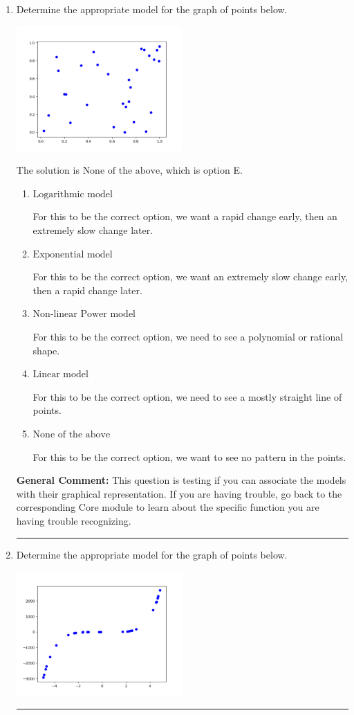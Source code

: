 \documentclass{extbook}[14pt]
\newcommand{\litem}[1]{\item #1

\rule{\textwidth}{0.4pt}}
\begin{document}
\begin{enumerate}\litem{
Determine the appropriate model for the graph of points below.

\begin{center}
    \includegraphics[width=0.5\textwidth]{../Figures/identifyModelGraph12C.png}
\end{center}




The solution is \( \text{None of the above} \), which is option E.\begin{enumerate}[label=\Alph*.]
\item \( \text{Logarithmic model} \)

For this to be the correct option, we want a rapid change early, then an extremely slow change later.
\item \( \text{Exponential model} \)

For this to be the correct option, we want an extremely slow change early, then a rapid change later.
\item \( \text{Non-linear Power model} \)

For this to be the correct option, we need to see a polynomial or rational shape.
\item \( \text{Linear model} \)

For this to be the correct option, we need to see a mostly straight line of points.
\item \( \text{None of the above} \)

For this to be the correct option, we want to see no pattern in the points.
\end{enumerate}

\textbf{General Comment:} This question is testing if you can associate the models with their graphical representation. If you are having trouble, go back to the corresponding Core module to learn about the specific function you are having trouble recognizing.
}
\litem{
Determine the appropriate model for the graph of points below.

\begin{center}
    \includegraphics[width=0.5\textwidth]{../Figures/identifyModelGraph12CopyC.png}
\end{center}




}
\end{enumerate}
\end{document}
